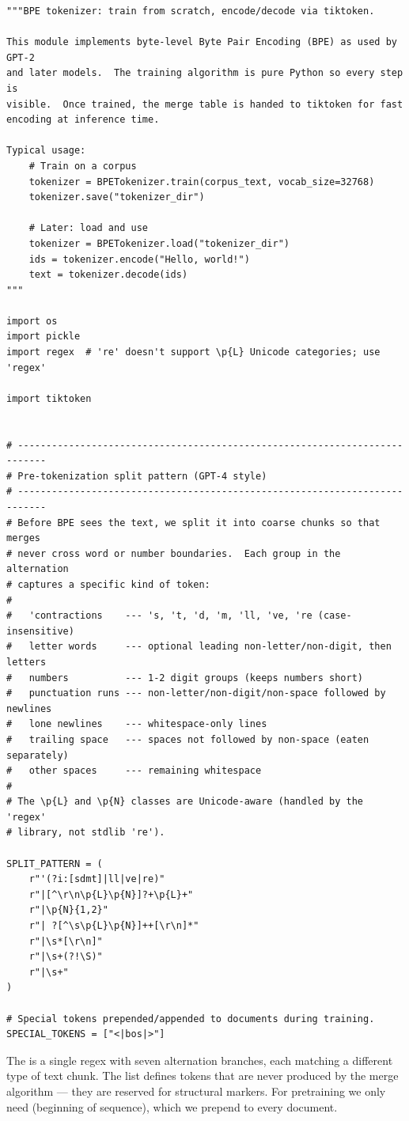 \begin{lstlisting}
"""BPE tokenizer: train from scratch, encode/decode via tiktoken.

This module implements byte-level Byte Pair Encoding (BPE) as used by GPT-2
and later models.  The training algorithm is pure Python so every step is
visible.  Once trained, the merge table is handed to tiktoken for fast
encoding at inference time.

Typical usage:
    # Train on a corpus
    tokenizer = BPETokenizer.train(corpus_text, vocab_size=32768)
    tokenizer.save("tokenizer_dir")

    # Later: load and use
    tokenizer = BPETokenizer.load("tokenizer_dir")
    ids = tokenizer.encode("Hello, world!")
    text = tokenizer.decode(ids)
"""

import os
import pickle
import regex  # 're' doesn't support \p{L} Unicode categories; use 'regex'

import tiktoken


# ---------------------------------------------------------------------------
# Pre-tokenization split pattern (GPT-4 style)
# ---------------------------------------------------------------------------
# Before BPE sees the text, we split it into coarse chunks so that merges
# never cross word or number boundaries.  Each group in the alternation
# captures a specific kind of token:
#
#   'contractions    --- 's, 't, 'd, 'm, 'll, 've, 're (case-insensitive)
#   letter words     --- optional leading non-letter/non-digit, then letters
#   numbers          --- 1-2 digit groups (keeps numbers short)
#   punctuation runs --- non-letter/non-digit/non-space followed by newlines
#   lone newlines    --- whitespace-only lines
#   trailing space   --- spaces not followed by non-space (eaten separately)
#   other spaces     --- remaining whitespace
#
# The \p{L} and \p{N} classes are Unicode-aware (handled by the 'regex'
# library, not stdlib 're').

SPLIT_PATTERN = (
    r"'(?i:[sdmt]|ll|ve|re)"
    r"|[^\r\n\p{L}\p{N}]?+\p{L}+"
    r"|\p{N}{1,2}"
    r"| ?[^\s\p{L}\p{N}]++[\r\n]*"
    r"|\s*[\r\n]"
    r"|\s+(?!\S)"
    r"|\s+"
)

# Special tokens prepended/appended to documents during training.
SPECIAL_TOKENS = ["<|bos|>"]
\end{lstlisting}

The  is a single regex with seven alternation branches, each matching a different type of text chunk.  The  list defines tokens that are never produced by the merge algorithm --- they are reserved for structural markers.  For pretraining we only need  (beginning of sequence), which we prepend to every document.

